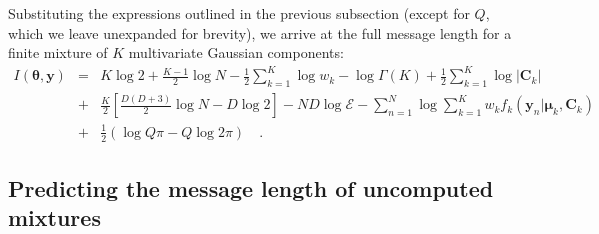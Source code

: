 \documentclass{article}
\newcommand{\vect}[1]{\boldsymbol{\mathbf{#1}}}
\def\veccov{\vect{C}}
\def\vecmean{\vect{\mu}}
\def\vectheta{\vect{\theta}}
\def\weight{w}
\def\weights{\vect{\weight}}
\def\datum{y}
\def\data{\vect{\datum}}
\begin{document}
\noindent{}Substituting the expressions outlined in the previous subsection
(except for $Q$, which we leave unexpanded for brevity), we arrive at the full
message length for a finite mixture of $K$ multivariate Gaussian components:
\begin{eqnarray}
  I(\vectheta,\data) &=&
      K\log{2} %
    + \frac{K - 1}{2}\log{N} - \frac{1}{2}\sum_{k=1}^{K}\log\weight_k - \log{\Gamma(K)} %
    + \frac{1}{2}\sum_{k=1}^{K}\log{|\veccov_k|} \nonumber \\ %
   &+&\frac{K}{2}\left[\frac{D(D+3)}{2}\log{N} - D\log{2}\right] %
    - ND\log\mathcal{E} - \sum_{n=1}^{N}\log\sum_{k=1}^{K}w_{k}f_k(\data_n|\vecmean_k,\veccov_k) \nonumber \\ %
   &+& \frac{1}{2}\left(\log{Q\pi} - Q\log{2\pi}\right) \quad . %
    \label{eq:objective-function}
\end{eqnarray}


\subsection{Predicting the message length of uncomputed mixtures}
\end{document}
